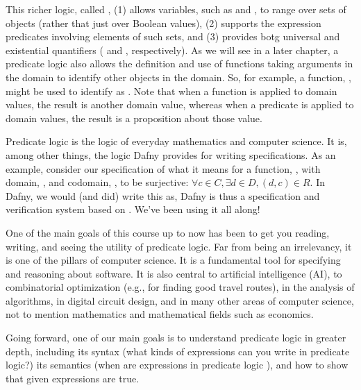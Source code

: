 \documentclass[letterpaper,10pt,english]{sphinxmanual}
\begin{document}
This richer logic, called , (1) allows variables,
such as  and , to range over sets of objects (rather that just
over Boolean values), (2) supports the expression predicates involving
elements of such sets, and (3) provides botg universal and existential
quantifiers ( and , respectively). As we will
see in a later chapter, a predicate logic also allows the definition
and use of functions taking arguments in the domain to identify other
objects in the domain. So, for example, a function, ,
might be used to identify  as . Note that when
a function is applied to domain values, the result is another domain
value, whereas when a predicate is applied to domain values, the
result is a proposition about those value.

Predicate logic is the logic of everyday mathematics and computer
science. It is, among other things, the logic Dafny provides for
writing specifications.  As an example, consider our specification of
what it means for a function, , with domain, , and codomain,
, to be surjective: \(\forall c \in C, \exists d \in D, (d,c)
\in R\). In Dafny, we would (and did) write this as,  Dafny is thus a
specification and verification system based on . We’ve been using it all along!

One of the main goals of this course up to now has been to get you
reading, writing, and seeing the utility of predicate logic. Far from
being an irrelevancy, it is one of the pillars of computer science. It
is a fundamental tool for specifying and reasoning about software.  It
is also central to artificial intelligence (AI), to combinatorial
optimization (e.g., for finding good travel routes), in the analysis
of algorithms, in digital circuit design, and in many other areas of
computer science, not to mention mathematics and mathematical fields
such as economics.

Going forward, one of our main goals is to understand predicate logic
in greater depth, including its syntax (what kinds of expressions can
you write in predicate logic?) its semantics (when are expressions in
predicate logic ), and how to show that given expressions are
true.
\end{document}
